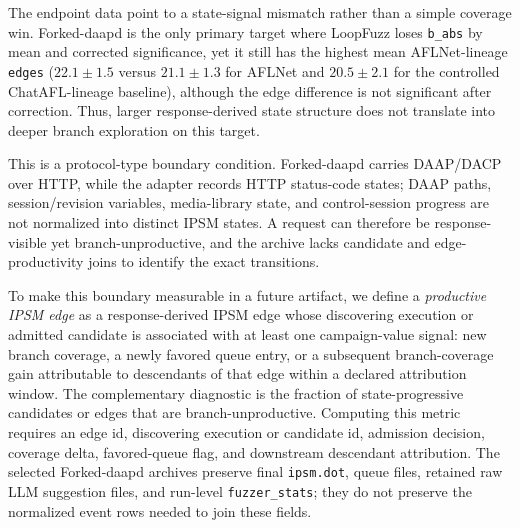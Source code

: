 \documentclass[final,5p,times,number]{elsarticle}
\begin{document}
The endpoint data point to a state-signal mismatch rather than a simple coverage win. Forked-daapd is the only primary target where LoopFuzz loses \texttt{b\_abs} by mean and corrected significance, yet it still has the highest mean AFLNet-lineage \texttt{edges} ($22.1{\pm}1.5$ versus $21.1{\pm}1.3$ for AFLNet and $20.5{\pm}2.1$ for the controlled ChatAFL-lineage baseline), although the edge difference is not significant after correction. Thus, larger response-derived state structure does not translate into deeper branch exploration on this target.

This is a protocol-type boundary condition. Forked-daapd carries DAAP/DACP over HTTP, while the adapter records HTTP status-code states; DAAP paths, session/revision variables, media-library state, and control-session progress are not normalized into distinct IPSM states. A request can therefore be response-visible yet branch-unproductive, and the archive lacks candidate and edge-productivity joins to identify the exact transitions.

To make this boundary measurable in a future artifact, we define a \emph{productive IPSM edge} as a response-derived IPSM edge whose discovering execution or admitted candidate is associated with at least one campaign-value signal: new branch coverage, a newly favored queue entry, or a subsequent branch-coverage gain attributable to descendants of that edge within a declared attribution window. The complementary diagnostic is the fraction of state-progressive candidates or edges that are branch-unproductive. Computing this metric requires an edge id, discovering execution or candidate id, admission decision, coverage delta, favored-queue flag, and downstream descendant attribution. The selected Forked-daapd archives preserve final \texttt{ipsm.dot}, queue files, retained raw LLM suggestion files, and run-level \texttt{fuzzer\_stats}; they do not preserve the normalized event rows needed to join these fields.
\end{document}
